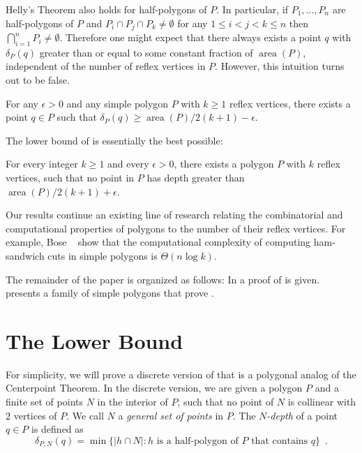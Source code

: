\documentclass{article}
\DeclareMathOperator{\area}{area}
\begin{document}
Helly's Theorem also holds for half-polygons of $P$.  In particular,
if $P_1,\ldots,P_n$ are half-polygons of $P$ and $P_i\cap P_j\cap
P_k\neq \emptyset$ for any $1\le i < j < k\le n$ then $\bigcap_{i=1}^n
P_i\neq \emptyset$.  Therefore one might expect that there always
exists a point $q$ with $\delta_P(q)$ greater than or equal to some
constant fraction of $\area(P)$, independent of the number of reflex
vertices in $P$.  However, this intuition turns out to be false.

\begin{thm}
For any $\epsilon > 0$ and any simple polygon $P$ with $k \ge 1$
reflex vertices, there exists a point $q\in P$ such that
$\delta_P(q)\ge \area(P)/2(k+1)-\epsilon$.
\end{thm}

The lower bound of  is essentially the best
possible:

\begin{thm}
For every integer $k\ge 1$ and every $\epsilon > 0$,
there exists a polygon $P$ with $k$ reflex vertices, such that no point
in $P$ has depth greater than  $\area(P)/2(k+1) + \epsilon$.
\end{thm}

Our results continue an existing line of research relating the
combinatorial and computational properties of polygons to the number
of their reflex vertices.  For example,  Bose \etal\ \cite{geoham}
show that the computational complexity of computing ham-sandwich cuts
in simple polygons is $\Theta(n\log k)$.  

The remainder of the paper is organized as follows: In
 a proof of  is given.
 presents a family of simple polygons that prove
.

\section{The Lower Bound}

For simplicity, we will prove a discrete version of
 that is a polygonal analog of the Centerpoint
Theorem.  In the discrete version, we are given a polygon $P$ and a
finite set of points $N$ in the interior of $P$, such that no point of
$N$ is collinear with 2 vertices of $P$.  We call $N$ a \emph{general
set of points} in $P$. The \emph{$N$-depth} of a point $q\in P$ is
defined as 
\[
     \delta_{P,N}(q) = \min\{|h\cap N| : \mbox{$h$ is a half-polygon
	of $P$ that contains $q$} \} \enspace .
\]
\end{document}
